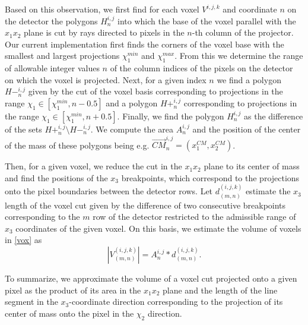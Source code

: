 Based on this observation, we first find for each voxel $V^{i,j,k}$ and coordinate $n$ on the detector the polygons $H^{i,j}_n$ into which the base of the voxel parallel with the $x_1x_2$ plane is cut by rays directed to pixels in the $n$-th column of the projector. Our current implementation first finds the corners of the voxel base with the smallest and largest projections $\chi_1^{min}$ and $\chi_1^{max}$. From this we determine the range of allowable integer values $n$ of the column indices of the pixels on the detector on which the voxel is projected. Next, for a given index $n$ we find a polygon $H-^{i, j}_n$ given by the cut of the voxel basis corresponding to projections in the range $\chi_1 \in [\chi_1^{min}, n-0.5]$ and a polygon $H+^{i, j}_n$ corresponding to projections in the range $\chi_1 \in [\chi_1^{min}, n+0.5]$. Finally, we find the polygon $H^{i, j}_n$ as the difference of the sets $H+^{i, j}_n \setminus H-^{i, j}_n$. We compute the area $A_{n}^{i,j}$ and the position of the center of the mass of these polygons being e.g. $\vec{CM}_n^{i,j} = (x_1^{CM},x_2^{CM})$. 

Then, for a given voxel, we reduce the cut in the $x_1 x_2$ plane to its center of mass and find the positions of the $x_3$ breakpoints, which correspond to the projections onto the pixel boundaries between the detector rows. Let $d^{(i,j,k)}_{(m,n)}$ estimate the $x_3$ length of the voxel cut given by the difference of two consecutive breakpoints corresponding to the $m$ row of the detector restricted to the admissible range of $x_3$ coordinates of the given voxel.  %
On this basis, we estimate the volume of voxels in \eqref{vox} as
\begin{equation}
    |V^{(i,j,k)}_{(m,n)}|=A_{n}^{i,j}*d^{(i,j,k)}_{(m,n)}. \label{eq:cutvolume}
\end{equation} 

To summarize, we approximate the volume of a voxel cut projected onto a given pixel as the product of its area in the $x_1 x_2$ plane and the length of the line segment in the $x_3$-coordinate direction corresponding to the projection of its center of mass onto the pixel in the $\chi_2$ direction. 

